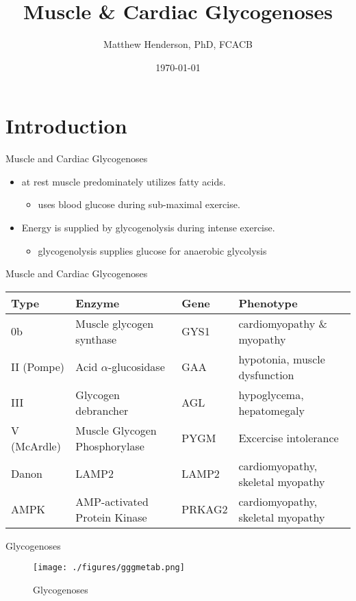 \documentclass[presentation, smaller]{beamer}
\author{Matthew Henderson, PhD, FCACB}
\date{\today}
\title{Muscle \& Cardiac Glycogenoses}
\institute[NSO]{Newborn Screening Ontario | The University of Ottawa}
\begin{document}
\maketitle


\section{Introduction}
\label{sec:orged8bd5c}
\begin{frame}[label={sec:orgb2364d4}]{Muscle and Cardiac Glycogenoses}
\begin{itemize}
\item at rest muscle predominately utilizes fatty acids.
\begin{itemize}
\item uses blood glucose during sub-maximal exercise.
\end{itemize}
\item Energy is supplied by glycogenolysis during intense exercise.
\begin{itemize}
\item glycogenolysis supplies glucose for anaerobic glycolysis
\end{itemize}
\end{itemize}
\end{frame}

\begin{frame}[label={sec:org5262fab}]{Muscle and Cardiac Glycogenoses}
\scriptsize
\begin{center}
\begin{tabular}{llll}
Type & Enzyme & Gene & Phenotype\\
\hline
0b & Muscle glycogen synthase & GYS1 & cardiomyopathy \& myopathy\\
II (Pompe) & Acid \(\alpha\)-glucosidase & GAA & hypotonia, muscle dysfunction\\
III & Glycogen debrancher & AGL & hypoglycema, hepatomegaly\\
V (McArdle) & Muscle Glycogen Phosphorylase & PYGM & Excercise intolerance\\
Danon & LAMP2 & LAMP2 & cardiomyopathy, \textpm{} skeletal myopathy\\
AMPK & AMP-activated Protein Kinase & PRKAG2 & cardiomyopathy, \textpm{} skeletal myopathy\\
\end{tabular}
\end{center}
\end{frame}

\begin{frame}[label={sec:org0978dac}]{Glycogenoses}
\begin{figure}[htbp]
\centering
\texttt{[image: ./figures/gggmetab.png]}
\caption[Glycogenoses]{\label{fig:org6d5dba5}
Glycogenoses}
\end{figure}
\end{frame}
\end{document}
